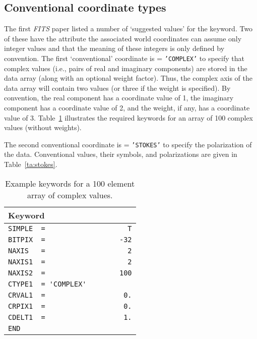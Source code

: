 \documentclass[onecolumn]{aa}
\begin{document}
\subsection{Conventional coordinate types}

The \label{sect:ConvCoord} first {\em FITS} paper \citep{wells81} listed a number of `suggested values'
for the  keyword.  Two of these have the attribute the 
associated world coordinates can assume only integer values and that the meaning
of these integers is only defined by convention. The first `conventional'
coordinate is  = {\tt 'COMPLEX'} to specify that 
complex values (i.e., pairs of real and imaginary components) are stored in 
the data array (along with an optional weight factor).  Thus, the complex
axis of the data array will contain two values (or three if the weight is specified).
By convention, the real component has a coordinate value of 1, 
the imaginary component has a coordinate value of 2, and the weight, if any, 
has a coordinate value of 3.   Table~\ref{ta:complex} illustrates the required
keywords for an array of 100 complex values (without weights).  

The second conventional coordinate is  = {\tt 'STOKES'}
to specify the polarization of the data.  Conventional values, their symbols,
and polarizations are given in Table~\ref{ta:stokes}. 

\begin{table}
\centering
\caption{Example keywords for a 100 element array of complex values.}
\label{ta:complex}
\begin{tabular}{l} 
\hline \hline
 Keyword \\
\hline
      {\verb+SIMPLE  =                    T+} \\
      {\verb+BITPIX  =                  -32+} \\
      {\verb+NAXIS   =                    2+} \\
      {\verb+NAXIS1  =                    2+} \\
      {\verb+NAXIS2  =                  100+} \\
      {\verb+CTYPE1  = 'COMPLEX'+}   \\
      {\verb+CRVAL1  =                   0.+}   \\
      {\verb+CRPIX1  =                   0.+}   \\
      {\verb+CDELT1  =                   1.+}   \\
      {\verb+END+}  \\ 
\hline
\end{tabular}
\end{table}
\end{document}
